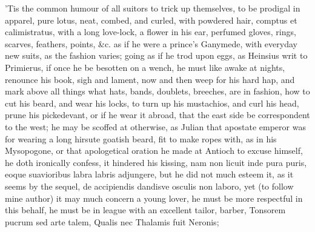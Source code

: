 {'Tis the common humour of all suitors to trick up themselves, to be
prodigal in apparel, pure lotus, neat, combed, and curled, with
powdered hair, comptus et calimistratus, with a long love-lock, a
flower in his ear, perfumed gloves, rings, scarves, feathers, points,
\&c. as if he were a prince's Ganymede, with everyday new suits, as the
fashion varies; going as if he trod upon eggs, as Heinsius writ to
Primierus, if once he be besotten on a wench, he must like awake
at nights, renounce his book, sigh and lament, now and then weep for
his hard hap, and mark above all things what hats, bands, doublets,
breeches, are in fashion, how to cut his beard, and wear his locks, to
turn up his mustachios, and curl his head, prune his pickedevant, or if
he wear it abroad, that the east side be correspondent to the west; he
may be scoffed at otherwise, as Julian that apostate emperor was for
wearing a long hirsute goatish beard, fit to make ropes with, as in his
Mysopogone, or that apologetical oration he made at Antioch to excuse
himself, he doth ironically confess, it hindered his kissing, nam non
licuit inde pura puris, eoque suavioribus labra labris adjungere, but
he did not much esteem it, as it seems by the sequel, de accipiendis
dandisve osculis non laboro, yet (to follow mine author) it may much
concern a young lover, he must be more respectful in this behalf, he
must be in league with an excellent tailor, barber,
Tonsorem pucrum sed arte talem,
Qualis nec Thalamis fuit Neronis;

}
